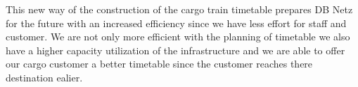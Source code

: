 \begin{itemize}
  This new way of the construction of the cargo train timetable prepares DB Netz for the future with an increased efficiency since we have less effort for staff and customer. We are not only more efficient with the planning of timetable we also have a higher capacity utilization of the infrastructure and we are able to offer our cargo customer a better timetable since the customer reaches there destination ealier.   \\

\end{itemize}
